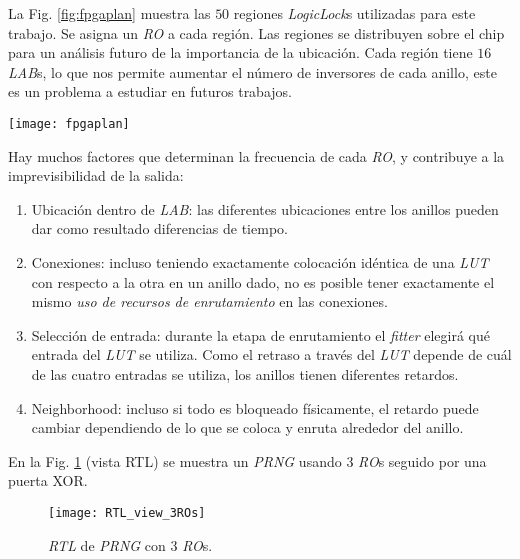 La Fig. \ref{fig:fpgaplan} muestra las $50$ regiones \emph{LogicLock}s utilizadas para este trabajo.
Se asigna un \emph{RO} a cada región.
Las regiones se distribuyen sobre el chip para un análisis futuro de la importancia de la ubicación.
Cada región tiene $16$ \emph{LAB}s, lo que nos permite aumentar el número de inversores de cada anillo, este es un problema a estudiar en futuros trabajos.

\begin{figure*}
\begin{center}
\texttt{[image: fpgaplan]}
\caption{Vista de las regiones \emph{LogicLock} del \emph{Chip Planner}.}
\label{fig:fpgaplan}
\end{center}
\end{figure*}

Hay muchos factores que determinan la frecuencia de cada \emph{RO}, y contribuye a la imprevisibilidad de la salida:
\begin{enumerate}

\item Ubicación dentro de \emph{LAB}: las diferentes ubicaciones entre los anillos pueden dar como resultado diferencias de tiempo.
\item Conexiones: incluso teniendo exactamente colocación idéntica de una \emph{LUT} con respecto a la otra en un anillo dado, no es posible tener exactamente el mismo \emph{uso de recursos de enrutamiento} en las conexiones.
\item Selección de entrada: durante la etapa de enrutamiento el \emph{fitter} elegirá qué entrada del \emph{LUT} se utiliza. Como el retraso a través del \emph{LUT} depende de cuál de las cuatro entradas se utiliza, los anillos tienen diferentes retardos.
\item Neighborhood: incluso si todo es bloqueado físicamente, el retardo puede cambiar dependiendo de lo que se coloca y enruta alrededor del anillo.
\end{enumerate}


En la Fig. \ref{fig:RTL3rings} (vista RTL) se muestra un \emph{PRNG} usando $3$ \emph{RO}s seguido por una puerta XOR.
%
\begin{figure}
\begin{center}
\texttt{[image: RTL\_view\_3ROs]}
\caption{\emph{RTL} de \emph{PRNG} con $3$ \emph{RO}s.}
\label{fig:RTL3rings}
\end{center}
\end{figure}

